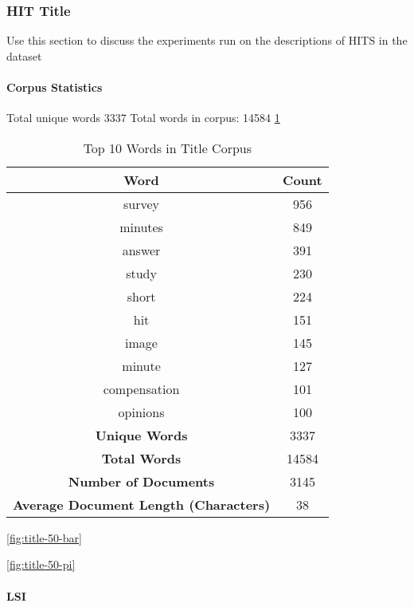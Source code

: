\documentclass[letterpaper,12pt]{article}
\begin{document}
\newpage
\subsubsection{HIT Title}
Use this section to discuss the experiments run on the descriptions of HITS in the dataset
\paragraph{Corpus Statistics}
Total unique words 3337
Total words in corpus: 14584
\ref{tab:title_top_words}

\begin{table}
	\caption{\label{tab:title_top_words} Top 10 Words in Title Corpus}
	\begin{center}
		\begin{tabular}{|c|c|}
			\hline
			\textbf{Word} & \textbf{Count} \\
			\hline
			survey & 956 \\
			\hline
			minutes & 849 \\
			\hline
			answer & 391 \\
			\hline
			study & 230 \\
			\hline
			short & 224 \\
			\hline
			hit & 151 \\
			\hline
			image & 145 \\
			\hline
			minute & 127 \\
			\hline
			compensation & 101 \\
			\hline
			opinions & 100 \\
			\hline
			\textbf{Unique Words} & 3337 \\
			\hline
			\textbf{Total Words} & 14584 \\
			\hline
			\textbf{Number of Documents} & 3145 \\
			\hline
			\textbf{Average Document Length (Characters)} & 38 \\
			\hline
		\end{tabular}
	\end{center}
\end{table}

\ref{fig:title-50-bar}

\ref{fig:title-50-pi}

\newpage
\paragraph{LSI}
\end{document}
